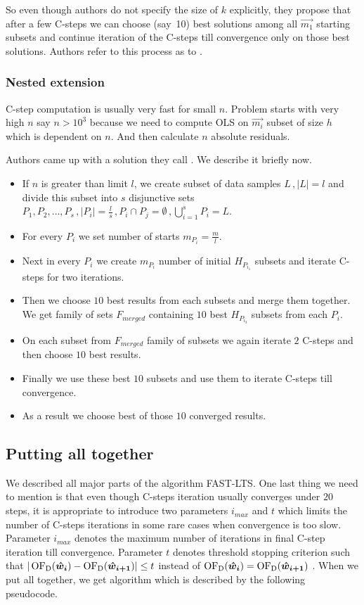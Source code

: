 So even though authors do not specify the size of $k$ explicitly, they propose that after a few C-steps we can choose (say~10) best solutions among all $\vec{m_1}$ starting subsets and continue iteration of the C-steps till convergence only on those best solutions.
Authors refer to this process as to .

\subsubsection*{Nested extension}
C-step computation is usually very fast for small $n$. Problem starts with very high $n$ say $n > 10^3$ because we need to compute OLS on $\vec{m_i}$ subset of size $h$ which is dependent on $n$. And then calculate $n$ absolute residuals.

Authors came up with a solution they call . We describe it briefly now.
\begin{itemize}
    \item If $n$ is greater than limit $l$, we create subset of data samples $L\,, |L| = l$ and divide this subset into $s$ disjunctive sets $P_1,P_2,\ldots,P_s\,, |P_i| = \frac{l}{s}\,, P_i\cap P_j  = \emptyset\,, \bigcup_{i=1}^{s} P_{i} = L$.
    \item For every $P_i$ we set number of starts $m_{P_i} = \frac{m}{l}$. 
    \item Next in every $P_i$ we create $m_{P_i}$ number of initial $H_{P_{i_1}}$ subsets and iterate C-steps for two iterations.
    \item Then we choose $10$ best results from each subsets and merge them together. We get family of sets
    $F_{merged}$ containing $10$ best $H_{P_{i_3}}$ subsets from each $P_i$.
    \item On each subset from  $F_{merged}$ family of subsets we again iterate $2$ C-steps and then choose $10$ best results.
    \item Finally we use these best $10$ subsets and use them to iterate C-steps till convergence.
    \item As a result we choose best of those $10$ converged results.
\end{itemize} 



\subsection{Putting all together}
We described all major parts of the algorithm FAST-LTS. One last thing we need to mention is that even though C-steps iteration usually converges under $20$ steps, it is appropriate to introduce two parameters 
$i_{max}$ and $t$ which limits the number of C-steps iterations in some rare cases when convergence is too slow. Parameter $i_{max}$ denotes the maximum number of iterations in final C-step iteration till convergence. Parameter $t$ denotes threshold stopping criterion such that $| \operatorname{OF_D}(\boldsymbol{\hat{w}_{i}}) - \operatorname{OF_D}(\boldsymbol{\hat{w}_{i+1}})| \leq t$ instead of 
$\operatorname{OF_D}(\boldsymbol{\hat{w}_{i}}) = \operatorname{OF_D}(\boldsymbol{\hat{w}_{i+1}})$ . When we put all together, we get  algorithm which is described by the following pseudocode.

